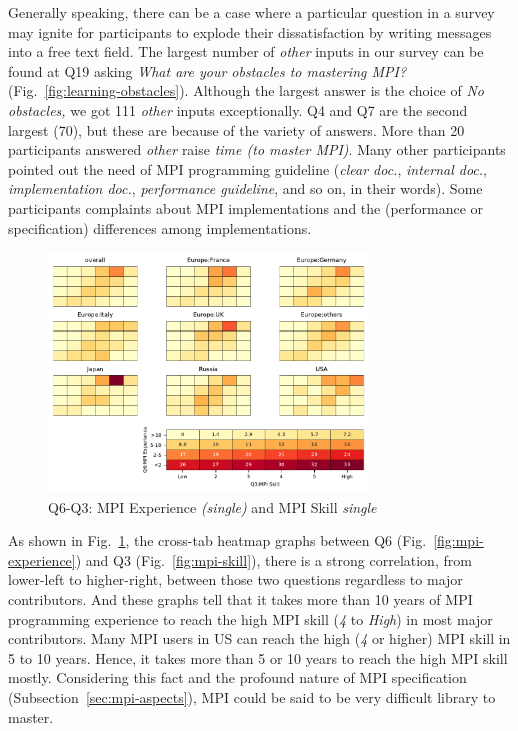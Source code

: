 \documentclass[preprint,5p,times]{elsarticle}
\def\myquote#1{{\it #1}}
\def\mcountries{major contributors\xspace{}}%
\begin{document}
Generally speaking, there can be a case where a particular question in
a survey may ignite for participants to explode their dissatisfaction
by writing messages into a free text field.
The largest number of \myquote{other} inputs in our survey can be found
at Q19 asking \myquote{What are your obstacles to mastering MPI?}
(Fig.~\ref{fig:learning-obstacles}). Although the largest answer is
the choice of \myquote{No obstacles,} we got 111 \myquote{other} inputs
exceptionally. Q4 and Q7 are the second largest (70), but these are
because of the variety of answers.
More than 20 participants answered \myquote{other} raise
\myquote{time (to master MPI)}. Many other participants pointed
out the need of MPI programming guideline (\myquote{clear doc.},
\myquote{internal doc.}, \myquote{implementation
  doc.}, \myquote{performance guideline}, and so on, in their words).
Some participants complaints about MPI implementations and the
(performance or specification) differences among implementations.

\begin{figure}[htb]
\begin{center}
\includegraphics[width=8.5cm]{Figs/Q6-Q3.pdf}
\caption{Q6-Q3: MPI Experience {\it(single)} and MPI Skill {\it single}}
\label{fig:experience-and-skill}
\end{center}
\end{figure}

As shown in Fig.~\ref{fig:experience-and-skill}, the cross-tab heatmap
graphs between Q6 (Fig.~\ref{fig:mpi-experience}) and Q3
(Fig.~\ref{fig:mpi-skill}), there is a strong correlation, from
lower-left to higher-right, between those
two questions regardless to \mcountries. And these graphs
tell that it takes more than 10 years of MPI programming experience to
reach the high MPI skill (\myquote{4} to \myquote{High}) in most
\mcountries. Many MPI users in US can reach the high
(\myquote{4} or higher) MPI skill in 5 to 10 years. Hence, it takes
more than 5 or 10 years to reach the high MPI skill
mostly. Considering this fact
and the profound nature of MPI specification
(Subsection~\ref{sec:mpi-aspects}), MPI could be said to be very
difficult library to master.
\end{document}
